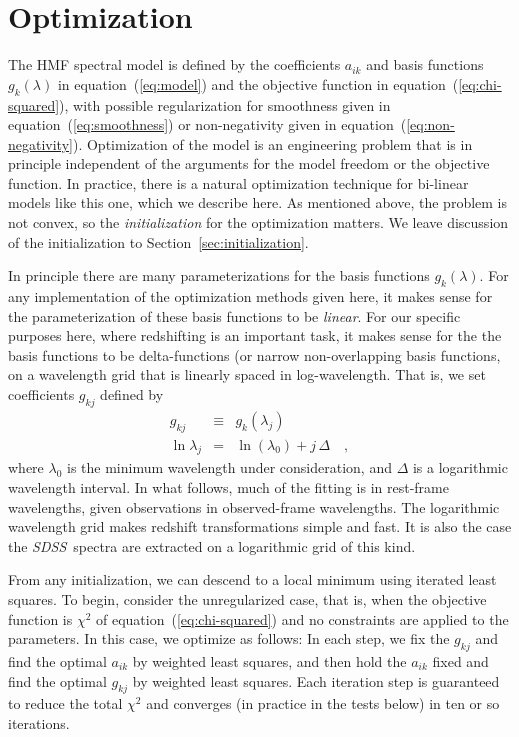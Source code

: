 \documentclass[12pt,preprint]{aastex}
\newcommand{\project}[1]{\textsl{#1}}
\newcommand{\sdss}{\project{SDSS}}
\newcommand{\sectionname}{Section}
\newcommand{\equationname}{equation}
\begin{document}
\section{Optimization}\label{sec:optimization}

The HMF spectral model is defined by the coefficients $a_{ik}$ and basis
functions $g_k(\lambda)$ in \equationname~(\ref{eq:model}) and the
objective function in \equationname~(\ref{eq:chi-squared}), with possible
regularization for smoothness given in
\equationname~(\ref{eq:smoothness}) or non-negativity given in
\equationname~(\ref{eq:non-negativity}).  Optimization of the model is an
engineering problem that is in principle independent of the arguments
for the model freedom or the objective function.  In practice, there
is a natural optimization technique for bi-linear models like this
one, which we describe here.  As mentioned above, the problem is not
convex, so the \emph{initialization} for the optimization matters.  We
leave discussion of the initialization to
\sectionname~\ref{sec:initialization}.

In principle there are many parameterizations for the basis functions
$g_k(\lambda)$.  For any implementation of the optimization methods
given here, it makes sense for the parameterization of these basis
functions to be \emph{linear}.  For our specific purposes here, where
redshifting is an important task, it makes sense for the the basis
functions to be delta-functions (or narrow non-overlapping basis
functions, on a wavelength grid that is linearly spaced in
log-wavelength.  That is, we set coefficients $g_{kj}$ defined by
\begin{eqnarray}\displaystyle
g_{kj} & \equiv & g_k(\lambda_j) \nonumber\\
\ln\lambda_j & = & \ln(\lambda_0) + j\,\Delta
\quad ,
\end{eqnarray}
where $\lambda_0$ is the minimum wavelength under consideration, and
$\Delta$ is a logarithmic wavelength interval.  In what follows, much
of the fitting is in rest-frame wavelengths, given observations in
observed-frame wavelengths.  The logarithmic wavelength grid makes
redshift transformations simple and fast.  It is also the case the
\sdss\ spectra are extracted on a logarithmic grid of this kind.

From any initialization, we can descend to a local minimum using
iterated least squares.  To begin, consider the unregularized case,
that is, when the objective function is $\chi^2$ of
\equationname~(\ref{eq:chi-squared}) and no constraints are applied to
the parameters.  In this case, we optimize as follows: In each step,
we fix the $g_{kj}$ and find the optimal $a_{ik}$ by weighted least
squares, and then hold the $a_{ik}$ fixed and find the optimal
$g_{kj}$ by weighted least squares. Each iteration step is guaranteed
to reduce the total $\chi^2$ and converges (in practice in the tests
below) in ten or so iterations.
\end{document}
